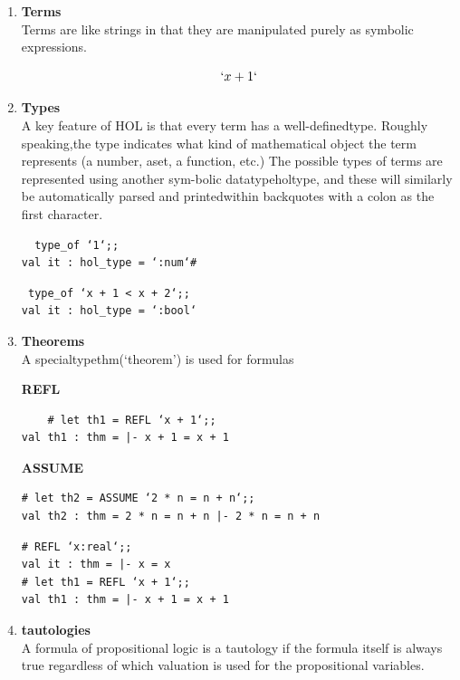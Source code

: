 \documentclass[15]{article}
\begin{document}
\begin{enumerate}

\item \textbf{Terms}
\\
Terms are like  strings  in  that  they  are  manipulated  purely  as  symbolic  expressions.

$$ {`}x+1{`} $$   

\item \textbf{Types}
\\
A key feature of HOL is that every term has a well-definedtype.  Roughly speaking,the type indicates what kind of mathematical object the term represents (a number, aset, a function, etc.)  The possible types of terms are represented using another sym-bolic datatypeholtype, and these will similarly be automatically parsed and printedwithin backquotes with a colon as the first character.


\begin{verbatim}  type_of ‘1‘;;
val it : hol_type = ‘:num‘# 
\end{verbatim}

\begin{verbatim} type_of ‘x + 1 < x + 2‘;;
val it : hol_type = ‘:bool‘
\end{verbatim}


\item \textbf{Theorems}\\
 A specialtypethm(‘theorem’) is used for formulas
 
\textbf{REFL}
\begin{verbatim}
    # let th1 = REFL ‘x + 1‘;;
val th1 : thm = |- x + 1 = x + 1
\end{verbatim}


\textbf{ASSUME}
\begin{verbatim}
# let th2 = ASSUME ‘2 * n = n + n‘;;
val th2 : thm = 2 * n = n + n |- 2 * n = n + n
\end{verbatim}


\begin{verbatim}
# REFL ‘x:real‘;;
val it : thm = |- x = x 
# let th1 = REFL ‘x + 1‘;;
val th1 : thm = |- x + 1 = x + 1
\end{verbatim}

\item \textbf{tautologies}\\

A formula of propositional logic is a tautology if the formula itself is always true regardless of which valuation is used for the propositional variables.


\end{enumerate}
\end{document}
